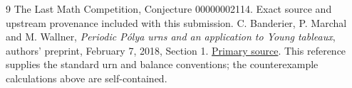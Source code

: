 \documentclass[11pt]{article}
\begin{document}
\begin{thebibliography}{9}
 The Last Math Competition,
Conjecture 00000002114. Exact source and upstream provenance
included with this submission.
 C. Banderier, P. Marchal and M. Wallner,
\emph{Periodic P\'olya urns and an application to Young tableaux},
authors' preprint, February 7, 2018, Section 1.
\href{https://www.math.univ-paris13.fr/~marchal/aofa18.pdf}{Primary source}.
This reference supplies the standard urn and balance conventions;
the counterexample calculations above are self-contained.
\end{thebibliography}
\end{document}
